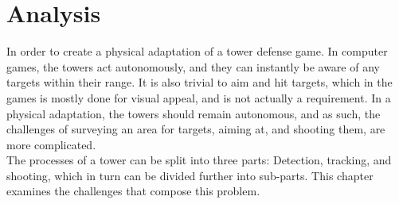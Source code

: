 \chapter{Analysis}\label{ch:analysis}
In order to create a physical adaptation of a tower defense game. In computer games, the towers act autonomously, and they can instantly be aware of any targets within their range. It is also trivial to aim and hit targets, which in the games is mostly done for visual appeal, and is not actually a requirement. In a physical adaptation, the towers should remain autonomous, and as such, the challenges of surveying an area for targets, aiming at, and shooting them, are more complicated. \\

The processes of a tower can be split into three parts: Detection, tracking, and shooting, which in turn can be divided further into sub-parts. This chapter examines the challenges that compose this problem.





